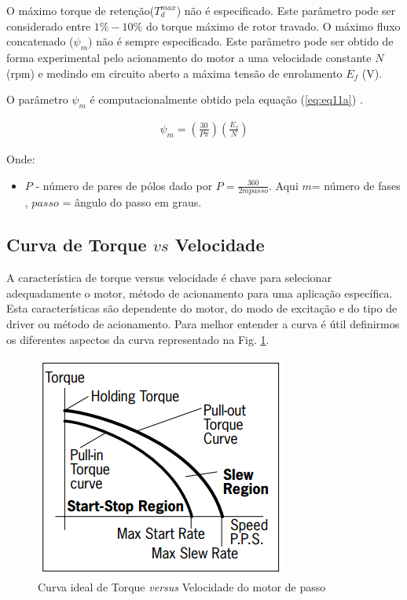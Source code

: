 O máximo torque de retenção($T_d^{max}$) não é especificado. Este parâmetro pode  ser considerado entre $1\%-10\%$ do torque máximo de rotor travado. O máximo fluxo concatenado ($\psi_m$) não é sempre especificado. Este parâmetro pode ser obtido de forma experimental pelo acionamento do motor a uma velocidade constante $N$ (rpm) e medindo em circuito aberto a máxima tensão de enrolamento $E_f$ (V).


O parâmetro $\psi_m$ é computacionalmente obtido pela equação (\ref{eq:eq11a}) \cite{mathworkmotor}.

\begin{eqnarray}
\label{eq:eq11a}
\psi_m = \left(\frac{30}{P \pi}\right) \left(\frac{E_f}{N}\right)
\end{eqnarray}

Onde:

\begin{itemize}
	\item $P$ - número de pares de pólos dado por $P = \frac{360}{2mpasso}$. Aqui $m$= número de fases , $passo$ = ângulo do passo em graus.
\end{itemize}

\subsection{Curva de Torque $vs$ Velocidade \cite{motorbas}}
A característica de torque versus velocidade é chave para selecionar adequadamente o motor, método de acionamento para uma aplicação específica. Esta características são dependente do motor, do modo de excitação e do tipo de driver ou método de acionamento. Para melhor entender a curva é útil definirmos os diferentes aspectos da curva representado na Fig. \ref{fig:fig3}.

\begin{figure}[H]
	\centering
	\includegraphics[scale=.6]{Images/curvatorquevelocidade_HSM.PNG}
	\caption{ Curva ideal de Torque \textit{versus} Velocidade do motor de passo }
	\label{fig:fig3}
\end{figure}

